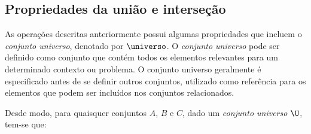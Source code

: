 \subsection{Propriedades da união e interseção}

As operações descritas anteriormente possui algumas propriedades que incluem o \emph{conjunto universo}, denotado por $\universo$. O \emph{conjunto universo} pode ser definido como conjunto que contém todos os elementos relevantes para um determinado contexto ou problema. O conjunto universo geralmente é especificado antes de se definir outros conjuntos, utilizado como referência para os elementos que podem ser incluídos nos conjuntos relacionados. 

Desde modo, para quaisquer conjuntos $A$, $B$ e $C$, dado um \emph{conjunto universo} $\U$, tem-se que:

